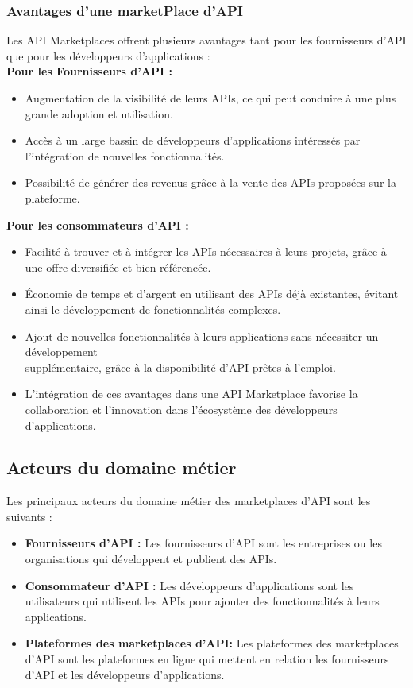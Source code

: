     \subsubsection{ Avantages d'une marketPlace d’API}
Les API Marketplaces offrent plusieurs avantages tant pour les fournisseurs d'API que pour les développeurs d'applications : \\
\textbf{Pour les Fournisseurs d'API :} 
\begin{itemize}
    \item Augmentation de la visibilité de leurs APIs, ce qui peut conduire à une plus grande adoption et utilisation.
    \item Accès à un large bassin de développeurs d'applications intéressés par l'intégration de nouvelles fonctionnalités.
    \item Possibilité de générer des revenus grâce à la vente des APIs proposées sur la plateforme.
\end{itemize}
\textbf{Pour les consommateurs d'API :} 
\begin{itemize}
    \item Facilité à trouver et à intégrer les APIs nécessaires à leurs projets, grâce à une offre diversifiée et bien référencée.
    \item Économie de temps et d'argent en utilisant des APIs déjà existantes, évitant ainsi le développement de fonctionnalités complexes.
    \item Ajout de nouvelles fonctionnalités à leurs applications sans nécessiter un développement \\ supplémentaire, grâce à la disponibilité d'API prêtes à l'emploi.
    \item L'intégration de ces avantages dans une API Marketplace favorise la collaboration et l'innovation dans l'écosystème des développeurs d'applications.
\end{itemize}

\subsection{Acteurs du domaine métier}
Les principaux acteurs du domaine métier des marketplaces d'API sont les suivants :
\begin{itemize}
    \item    \textbf{Fournisseurs d'API :}  Les fournisseurs d'API sont les entreprises ou les organisations qui développent et publient des APIs.
    \item  \textbf{Consommateur d’API :} Les développeurs d'applications sont les utilisateurs qui utilisent les APIs pour ajouter des fonctionnalités à leurs applications.
    \item \textbf{Plateformes des marketplaces d'API:} Les plateformes des marketplaces d'API sont les plateformes en ligne qui mettent en relation les fournisseurs d'API et les développeurs d'applications.
\end{itemize}
        \pagebreak

